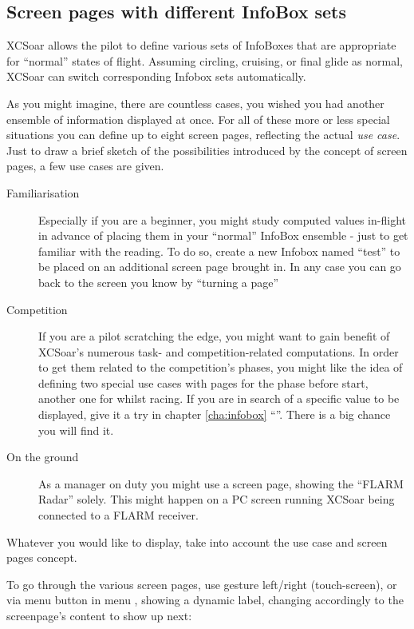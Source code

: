 \subsection*{Screen pages with different InfoBox sets}\label{sec:screenpages}

XCSoar allows the pilot to define various sets of InfoBoxes that are 
appropriate for ``normal'' states of flight.  Assuming circling,
cruising, or final glide as normal, XCSoar can switch corresponding Infobox 
sets automatically.

As you might imagine, there are countless cases, you wished you had another 
ensemble of information displayed at once.  For all of these more or less 
special situations you can define up to eight screen pages, reflecting the 
actual \emph{use case}. Just to draw a brief sketch of the possibilities 
introduced by the concept of screen pages, a few use cases are given. 
\label{par:use_case}
\begin{description}
\item[Familiarisation] Especially if you are a beginner, you might study 
computed values in-flight in advance of placing them in your ``normal'' InfoBox
ensemble - just to get familiar with the reading. To do so, create a new 
Infobox named ``test'' to be placed on an additional screen page brought in. In
any case you can go back to the screen you know by ``turning a page''
\item[Competition] If you are a pilot scratching the edge, you might want to 
gain benefit of XCSoar's numerous task- and competition-related computations. 
In order to get them related to the competition's phases, you might like the 
idea of defining two special use cases with pages for the phase before start, 
another one for whilst racing.  If you are in search of a specific value to
be displayed, give it a try in chapter \ref{cha:infobox} ``''.
There is a big chance you will find it.
\item[On the ground] As a manager on duty you might use a screen page, showing 
the ``FLARM Radar'' solely.  This might happen on a PC screen running XCSoar
being connected to a FLARM receiver.
\end{description}

Whatever you would like to display, take into account the use case and screen 
pages concept.

To go through the various screen pages, use gesture left/right (touch-screen), or via menu button in menu , showing a dynamic label, changing accordingly to the screenpage's content to show up next:

